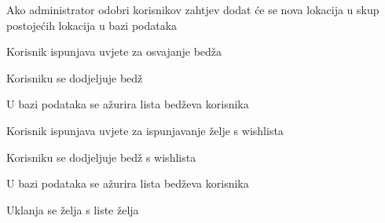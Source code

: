 \begin{packed_item}
\begin{packed_item}
\begin{packed_enum}
								\item Ako administrator odobri korisnikov zahtjev dodat će se nova lokacija u skup postojećih lokacija u bazi podataka
								
							\end{packed_enum}
							
							\item[13.b] Korisnik ispunjava uvjete za osvajanje bedža
							\item[] \begin{packed_enum}
							    \item Korisniku se dodjeljuje bedž
							    \item U bazi podataka se ažurira lista bedževa korisnika
							\end{packed_enum}
							
							\item[13.c] Korisnik ispunjava uvjete za ispunjavanje želje s wishlista
							\item[] \begin{packed_enum}
							    \item Korisniku se dodjeljuje bedž s wishlista
							    \item U bazi podataka se ažurira lista bedževa korisnika
							    \item Uklanja se želja s liste želja
							\end{packed_enum}
							
						\end{packed_item}
						
					\end{packed_item}
					
